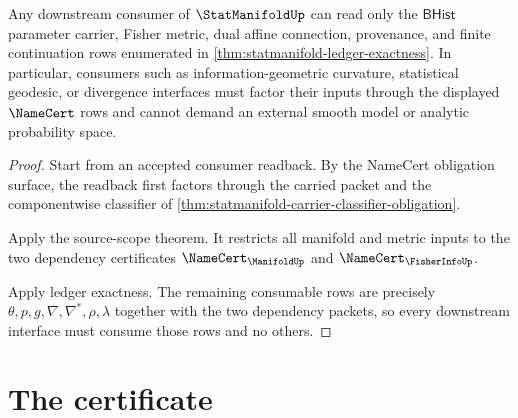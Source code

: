 \begin{theorem}
\label{thm:statmanifold-downstream-consumption-boundary}
Any downstream consumer of $\StatManifoldUp$ can read only the
$\mathsf{BHist}$ parameter carrier, Fisher metric, dual affine connection,
provenance, and finite continuation rows enumerated in
\autoref{thm:statmanifold-ledger-exactness}. In particular, consumers such as
information-geometric curvature, statistical geodesic, or divergence
interfaces must factor their inputs through the displayed $\NameCert$ rows
and cannot demand an external smooth model or analytic probability space.
\end{theorem}
\begin{proof}
Start from an accepted consumer readback. By the NameCert obligation surface,
the readback first factors through the carried packet and the componentwise
classifier of
\autoref{thm:statmanifold-carrier-classifier-obligation}.

Apply the source-scope theorem. It restricts all manifold and metric inputs to
the two dependency certificates $\NameCert_{\ManifoldUp}$ and
$\NameCert_{\FisherInfoUp}$.

Apply ledger exactness. The remaining consumable rows are precisely
$\theta,p,g,\nabla,\nabla^\ast,\rho,\lambda$ together with the two dependency
packets, so every downstream interface must consume those rows and no others.
\end{proof}

\section{The certificate}
\label{sec:statmanifold-certificate}

